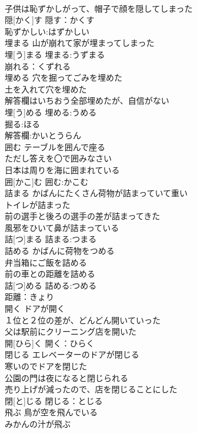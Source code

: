\documentclass[8pt]{extreport}
\begin{document}
\begin{CJK}{UTF8}{min}
\\	子供は恥ずかしがって、帽子で顔を隠してしまった 
\\	隠[かく]す			隠す：かくす
\\	恥ずかしい:はずかしい
\\	埋まる	山が崩れて家が埋まってしまった 
\\	埋[う]まる			埋まる:うずまる
\\	崩れる：くずれる
\\	埋める	穴を掘ってごみを埋めた 
\\	土を入れて穴を埋めた 
\\	解答欄はいちおう全部埋めたが、自信がない 
\\	埋[う]める			埋める:うめる
\\	掘る:ほる
\\	解答欄:かいとうらん
\\	囲む	テーブルを囲んで座る 
\\	ただし答えを〇で囲みなさい 
\\	日本は周りを海に囲まれている 
\\	囲[かこ]む			囲む:かこむ
\\	詰まる	かばんにたくさん荷物が詰まっていて重い 
\\	トイレが詰まった 
\\	前の選手と後ろの選手の差が詰まってきた 
\\	風邪をひいて鼻が詰まっている 
\\	詰[つ]まる			詰まる:つまる
\\	詰める	かばんに荷物をつめる 
\\	弁当箱にご飯を詰める 
\\	前の車との距離を詰める 
\\	詰[つ]める			詰める:つめる
\\	距離：きょり
\\	開く	ドアが開く 
\\	１位と２位の差が、どんどん開いていった 
\\	父は駅前にクリーニング店を開いた 
\\	開[ひら]く			開く：ひらく
\\	閉じる	エレベーターのドアが閉じる 
\\	寒いのでドアを閉じた 
\\	公園の門は夜になると閉じられる 
\\	売り上げが減ったので、店を閉じることにした 
\\	閉[と]じる			閉じる：とじる
\\	飛ぶ	鳥が空を飛んでいる 
\\	みかんの汁が飛ぶ 

\end{CJK}
\end{document}

